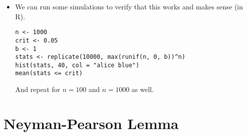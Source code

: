 \begin{itemize}
\begin{ex}
    Then (for the numerator)
    \begin{equation*}
      \sup_{b ≥ 1} L(b; x₁,…,x_n) =
      \begin{cases}
        1 & \text{if } 1 > \max_i X_i \\
        (\max_i X_i)^{-n} & \text{if } 1 ≤ \max_i X_i.
      \end{cases}
    \end{equation*}
    and (for the denominator)
    \begin{equation*}
      \sup_{b > 0} L(b; x₁,…,x_n) = (\max_i X_i)^{-n}.
    \end{equation*}
    Putting them together, we get
    \begin{equation*}
      Λ(x) =
      \begin{cases}
        (\max_i X_i)^n & \text{if } \max_i X_i ≤ 1. \\
        1 & \text{if } \max_i X_i > 1 \\
      \end{cases}
    \end{equation*}

    Now, to find $c$ so that $\sup_{b ≥ 1} \Pr_b[(\max_i X_i)ⁿ ≤ c] = α$
    \begin{align*}
      \sup_{b ≥ 1} \Pr_b[(\max_i X_i)ⁿ ≤ c]
      &= \sup_{b≥ 1} \Pr_b[\max_i X_i/b ≤ c^{1/n}/b] \\
      &= \sup_{b ≥ 1} \Pr_b[X₁/b ≤ c^{1/n}/b, ..., X_n/b ≤ c^{1/n}/b] \\
      &= \sup_{b ≥ 1} \Pr_b[X₁/b ≤ c^{1/n}/b] ⋯ \Pr_b[X_n/b ≤ c^{1/n}/b] \\
      &= \sup_{b ≥ 1} c/bⁿ \\
      &= c
    \end{align*}
    where we're using the fact that $X_i/b ∼ \uniform(0,1)$.  So
    $c=α$.  This test is obviously equivalent to comparing $\max_i
    X_i$ to $α^{1/n}$.
  \end{ex}

\item We can run some simulations to verify that this works and makes
  sense (in R).
\begin{verbatim}
n <- 1000
crit <- 0.05
b <- 1
stats <- replicate(10000, max(runif(n, 0, b))^n)
hist(stats, 40, col = "alice blue")
mean(stats <= crit)
\end{verbatim}
  And repeat for $n = 100$ and $n = 1000$ as well.
\end{itemize}

\section{Neyman-Pearson Lemma}

